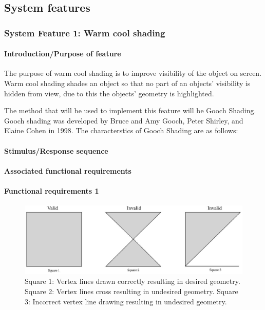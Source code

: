\documentclass[10pt,journal,compsoc,draftclsnofoot]{IEEEtran}
\begin{document}
\begin{flushleft}
\subsection{System features}
\vspace{3mm}

\subsubsection{System Feature 1: Warm cool shading}
	
\paragraph{Introduction/Purpose of feature}
The purpose of warm cool shading is to improve visibility of the object on screen.
Warm cool shading shades an object so that no part of an objects' visibility is hidden from view, due to this the objects' geometry is highlighted.

The method that will be used to implement this feature will be Gooch Shading.
Gooch shading was developed by Bruce and Amy Gooch, Peter Shirley, and Elaine Cohen in 1998.
The characterstics of Gooch Shading are as follows:

\paragraph{Stimulus/Response sequence}

\paragraph{Associated functional requirements}

\paragraph{Functional requirements 1}
\begin{figure} [h]
  \includegraphics[width=\linewidth]{squares.eps}
  \caption
{ \newline \hspace{\linewidth}
Square 1: Vertex lines drawn correctly resulting in desired geometry. \newline \hspace{\linewidth}
Square 2: Vertex lines cross resulting in undesired geometry. \newline \hspace{\linewidth}
Square 3: Incorrect vertex line drawing resulting in undesired geometry.}
  \label{fig:squares}
\end{figure}


\end{flushleft}
\end{document}
